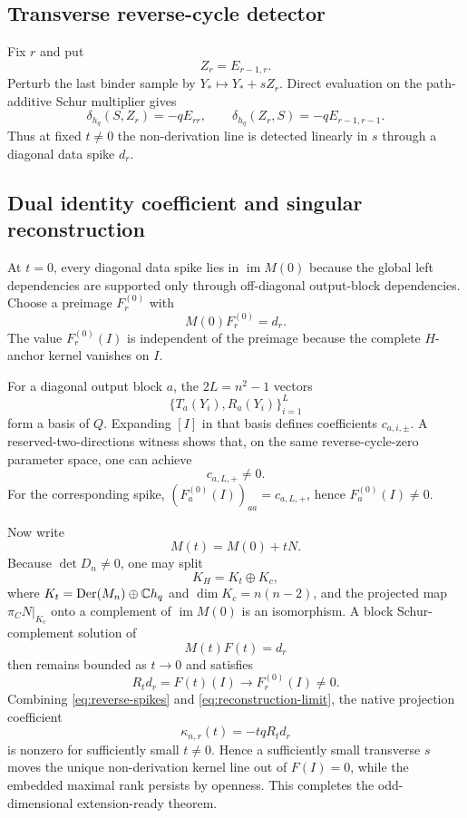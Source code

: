 \subsection{Transverse reverse-cycle detector}
Fix $r$ and put
\[
Z_r=E_{r-1,r}.
\]
Perturb the last binder sample by $Y_*\mapsto Y_*+sZ_r$. Direct evaluation on the path-additive Schur multiplier gives
\begin{equation}\label{eq:reverse-spikes}
\delta_{h_q}(S,Z_r)=-qE_{rr},\qquad
\delta_{h_q}(Z_r,S)=-qE_{r-1,r-1}.
\end{equation}
Thus at fixed $t\ne0$ the non-derivation line is detected linearly in $s$ through a diagonal data spike $d_r$.

\subsection{Dual identity coefficient and singular reconstruction}
At $t=0$, every diagonal data spike lies in $\operatorname{im}M(0)$ because the global left dependencies are supported only through off-diagonal output-block dependencies. Choose a preimage $F_r^{(0)}$ with
\[
M(0)F_r^{(0)}=d_r.
\]
The value $F_r^{(0)}(I)$ is independent of the preimage because the complete $H$-anchor kernel vanishes on $I$.

For a diagonal output block $a$, the $2L=n^2-1$ vectors
\[
\{T_a(Y_i),R_a(Y_i)\}_{i=1}^{L}
\]
form a basis of $Q$. Expanding $[I]$ in that basis defines coefficients $c_{a,i,\pm}$. A reserved-two-directions witness shows that, on the same reverse-cycle-zero parameter space, one can achieve
\begin{equation}\label{eq:dual-nonzero}
c_{a,L,+}\ne0.
\end{equation}
For the corresponding spike, $(F_a^{(0)}(I))_{aa}=c_{a,L,+}$, hence $F_a^{(0)}(I)\ne0$.

Now write
\[
M(t)=M(0)+tN.
\]
Because $\det D_n\ne0$, one may split
\[
K_H=K_t\oplus K_c,
\]
where $K_t=\operatorname{Der}(M_n)\oplus\mathbb C h_q$ and $\dim K_c=n(n-2)$, and the projected map $\pi_C N|_{K_c}$ onto a complement of $\operatorname{im}M(0)$ is an isomorphism. A block Schur-complement solution of
\[
M(t)F(t)=d_r
\]
then remains bounded as $t\to0$ and satisfies
\begin{equation}\label{eq:reconstruction-limit}
R_t d_r=F(t)(I)\longrightarrow F_r^{(0)}(I)\ne0.
\end{equation}
Combining \eqref{eq:reverse-spikes} and \eqref{eq:reconstruction-limit}, the native projection coefficient
\[
\kappa_{n,r}(t)=-tqR_t d_r
\]
is nonzero for sufficiently small $t\ne0$. Hence a sufficiently small transverse $s$ moves the unique non-derivation kernel line out of $F(I)=0$, while the embedded maximal rank persists by openness. This completes the odd-dimensional extension-ready theorem.

